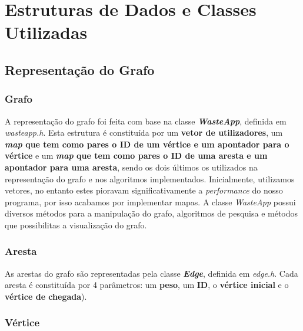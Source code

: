 \documentclass[article, a4paper, 12pt, oneside]{memoir}
\begin{document}
\newpage
\chapter[Estruturas de Dados  e Classes Utilizadas][Estruturas de Dados e Classes Utilizadas]{Estruturas de Dados e Classes Utilizadas} \label{\thechapter}

\section{Representação do Grafo}

\subsection{Grafo}

A representação do grafo foi feita com base na classe \textbf{\textit{WasteApp}}, definida em \textit{wasteapp.h}.  Esta estrutura é constituída por um \textbf{vetor de utilizadores}, um \textbf{\textit{map} que tem como pares o ID de um vértice e um apontador para o vértice} e um \textbf{\textit{map} que tem como pares o ID de uma aresta e um apontador para uma aresta}, sendo os dois últimos os utilizados na representação do grafo e nos algoritmos implementados. Inicialmente, utilizamos vetores, no entanto estes pioravam significativamente a \textit{performance} do nosso programa, por isso acabamos por implementar mapas. A classe \textit{WasteApp} possui diversos métodos para a manipulação do grafo, algoritmos de pesquisa e métodos que possibilitas a visualização do grafo.

\subsection{Aresta}

As arestas do grafo são representadas pela classe \textbf{\textit{Edge}}, definida em \textit{edge.h}. Cada aresta é constituída por 4 parâmetros: um \textbf{peso}, um \textbf{ID}, o \textbf{vértice inicial} e o \textbf{vértice de chegada}).

\subsection{Vértice}
\end{document}
